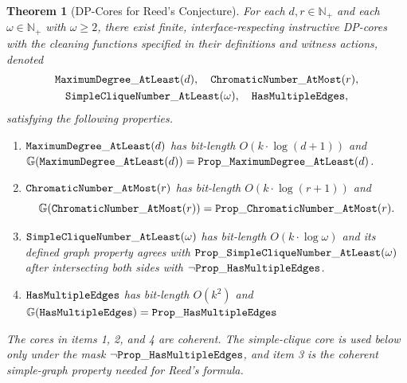 \documentclass[11pt,a4paper]{article}
\newtheorem{theorem}{Theorem}
\newcommand{\treewidthvalue}{k}
\newcommand{\Nplus}{\mathbb{N}_{+}}
\newcommand{\dpcoregraphproperty}[1]{\mathbb{G}(#1)}
\newcommand{\dpNamePart}[1]{\mbox{\normalfont\ttfamily #1}}
\newcommand{\hasMultiEdgeProperty}{\dpNamePart{Prop}\_\allowbreak\dpNamePart{HasMultipleEdges}}
\newcommand{\simpleCliqueNumberAtLeastProperty}[1]{\dpNamePart{Prop}\_\allowbreak\dpNamePart{SimpleCliqueNumber}\_\allowbreak\dpNamePart{AtLeast}(#1)}
\newcommand{\maxDegreeAtLeastProperty}[1]{\dpNamePart{Prop}\_\allowbreak\dpNamePart{MaximumDegree}\_\allowbreak\dpNamePart{AtLeast}(#1)}
\newcommand{\chromaticNumberAtMostProperty}[1]{\dpNamePart{Prop}\_\allowbreak\dpNamePart{ChromaticNumber}\_\allowbreak\dpNamePart{AtMost}(#1)}
\newcommand{\hasMultiEdgeCore}{\dpNamePart{HasMultipleEdges}}
\newcommand{\simpleCliqueNumberAtLeastCore}[1]{\dpNamePart{SimpleCliqueNumber}\_\allowbreak\dpNamePart{AtLeast}(#1)}
\newcommand{\maxDegreeAtLeastCore}[1]{\dpNamePart{MaximumDegree}\_\allowbreak\dpNamePart{AtLeast}(#1)}
\newcommand{\numbercolors}{r}
\newcommand{\chromaticnumberAtMostCore}[1]{\dpNamePart{ChromaticNumber}\_\allowbreak\dpNamePart{AtMost}(#1)}
\newcommand{\cliqueparameter}{\omega}
\newcommand{\maxdegreeparameter}{d}
\begin{document}
\begin{theorem}[DP-Cores for Reed's Conjecture]
\label{theorem:CoreExistence}
For each $\maxdegreeparameter,\numbercolors\in \Nplus$ and each $\cliqueparameter\in \Nplus$ with $\cliqueparameter\ge 2$, there exist finite, interface-respecting instructive DP-cores with the cleaning functions specified in their definitions and witness actions, denoted
\[
\begin{gathered}
\maxDegreeAtLeastCore{\maxdegreeparameter},\quad
\chromaticnumberAtMostCore{\numbercolors},\\
\simpleCliqueNumberAtLeastCore{\cliqueparameter},\quad
\hasMultiEdgeCore,
\end{gathered}
\]
satisfying the following properties.
	\begin{enumerate}
		\item $\maxDegreeAtLeastCore{\maxdegreeparameter}$ has bit-length $O(\treewidthvalue\cdot \log(\maxdegreeparameter+1))$ and
	$\dpcoregraphproperty{\maxDegreeAtLeastCore{\maxdegreeparameter}} = \maxDegreeAtLeastProperty{\maxdegreeparameter}$.
			\item $\chromaticnumberAtMostCore{\numbercolors}$ has bit-length $O(\treewidthvalue\cdot\log(\numbercolors+1))$ and
		\[
		\dpcoregraphproperty{\chromaticnumberAtMostCore{\numbercolors}}
		= \chromaticNumberAtMostProperty{\numbercolors}.
		\]
	\item $\simpleCliqueNumberAtLeastCore{\cliqueparameter}$ has bit-length  $O(\treewidthvalue\cdot \log \cliqueparameter)$ and its defined graph property agrees with $\simpleCliqueNumberAtLeastProperty{\cliqueparameter}$ after intersecting both sides with $\neg \hasMultiEdgeProperty$.
	\item $\hasMultiEdgeCore$ has bit-length  $O(\treewidthvalue^2)$ and $\dpcoregraphproperty{\hasMultiEdgeCore} = \hasMultiEdgeProperty$
	\end{enumerate}
	The cores in items 1, 2, and 4 are coherent. The simple-clique core is used below only under the mask $\neg\hasMultiEdgeProperty$, and item 3 is the coherent simple-graph property needed for Reed's formula.
	\end{theorem}
\end{document}

